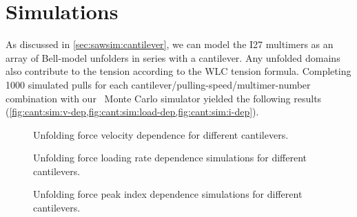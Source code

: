 \section{Simulations}
\label{sec:cantilever:simulations}

As discussed in \cref{sec:sawsim:cantilever}, we can model the I27
multimers as an array of Bell-model unfolders in series with a
cantilever.  Any unfolded domains also contribute to the tension
according to the WLC tension formula.  Completing 1000
simulated pulls for each cantilever/pulling-speed/multimer-number
combination with our \sawsim\ Monte Carlo simulator yielded the
following results
(\cref{fig:cant:sim:v-dep,fig:cant:sim:load-dep,fig:cant:sim:i-dep}).

\begin{figure}
  \caption{Unfolding force velocity dependence for different
    cantilevers.\label{fig:cant:sim:v-dep}}
\end{figure}

\begin{figure}
  \caption{Unfolding force loading rate dependence simulations for
    different cantilevers.\label{fig:cant:sim:load-dep}}
\end{figure}

\begin{figure}
  \caption{Unfolding force peak index dependence simulations for
    different cantilevers.\label{fig:cant:sim:i-dep}}
\end{figure}

%
%
%
%
%

